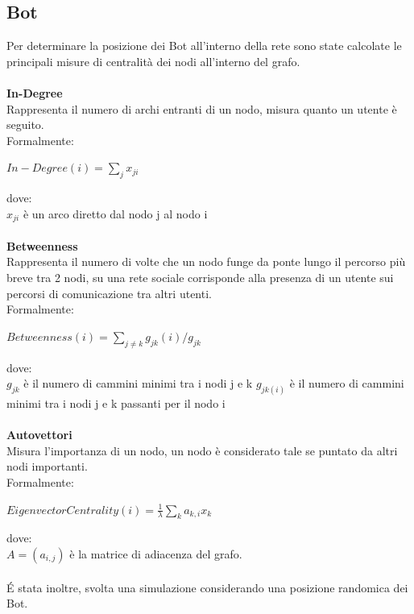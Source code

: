 \subsection{Bot}\label{Bot}
    Per determinare la posizione dei Bot all'interno della rete sono state calcolate le principali misure di centralità dei nodi all'interno del grafo.
    \\\\
    \textbf{In-Degree}
    \\
    Rappresenta il numero di archi entranti di un nodo, misura quanto un utente è seguito.\\
    Formalmente: \\
    \begin{center}
        $In-Degree(i) = \displaystyle\sum_{j}x_{ji}$
    \end{center}
    dove: \\
    $x_{ji}$ è un arco diretto dal nodo j al nodo i
    \\
    \\
    \textbf{Betweenness}
    \\
    Rappresenta il numero di volte che un nodo funge da ponte lungo il percorso più breve tra 2 nodi, su una rete sociale corrisponde alla presenza di un utente sui percorsi di comunicazione tra altri utenti.\\
    Formalmente: \newline
    \begin{center}
         $Betweenness(i) = \displaystyle\sum_{j \neq k } g_{jk}(i)/g_{jk}$ 
    \end{center}
    dove: \\
    $g_{jk}$ è il numero di cammini minimi tra i nodi j e k \newline 
    $g_{jk(i)}$ è il numero di cammini minimi tra i nodi j e k passanti per il nodo i
   \\
    \\
    \textbf{Autovettori}
    \\
    Misura l'importanza di un nodo, un nodo è considerato tale se puntato da altri nodi importanti. \\
    Formalmente: \\
    \begin{center}
    $EigenvectorCentrality(i) = \frac{1}{\lambda}\displaystyle\sum_{k}a_{k,i}x_{k}$
    \end{center}
    dove: \\
    $A=(a_{i,j})$ è la matrice di adiacenza del grafo.
\\\\
    É stata inoltre, svolta una simulazione considerando una posizione randomica dei Bot.

